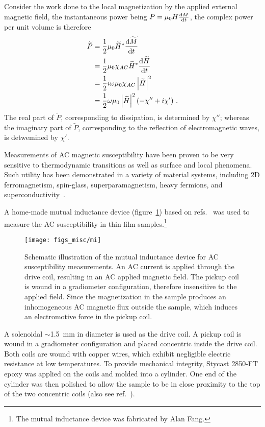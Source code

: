 Consider the work done to the local magnetization by the applied external magnetic field, the instantaneous power being $P = \mu_0H\frac{\mathop{}\!\mathrm{d} M}{\mathop{}\!\mathrm{d} t}$, the complex power per unit volume is therefore%
\begin{align}%
    \widetilde{P} &= \frac{1}{2}\mu_0 \widetilde{H}^* \frac{\diff \widetilde{M}}{\diff t}\nonumber\\
        &= \frac{1}{2}\mu_0\chi_{AC}\widetilde{H}^*\frac{\diff \widetilde{H}}{\diff t}\nonumber\\
        &= \frac{1}{2}i\omega\mu_0\chi_{AC}\left|\widetilde{H}\right|^2\nonumber\\
        &= \frac{1}{2}\omega\mu_0\left|\widetilde{H}\right|^2(-\chi''+i\chi')\label{eq:acm_power}~.
\end{align}%
The real part of $\widetilde{P}$, corresponding to dissipation, is determined by $\chi''$; whereas the imaginary part of $\widetilde{P}$, corresponding to the reflection of electromagnetic waves, is detwemined by $\chi'$.

Measurements of AC magnetic susceptibility have been proven to be very sensitive to thermodynamic transitions as well as surface and local phenomena. Such utility has been demonstrated in a variety of material systems, including 2D ferromagnetism, spin-glass, superparamagnetism, heavy fermions, and superconductivity~\cite{ac_nitroxide, ac_spin_glass, ac_superpara, Ando1994, Gegenwart2005, Schemm2014}.

A home-made mutual inductance device (figure~\ref{fig:mi_sketch}) based on refs.~\cite{Jeanneret1989} was used to measure the AC susceptibility in thin film samples.\footnote{The mutual inductance device was fabricated by Alan Fang.} %
\begin{figure}[ht]%
	\centering%
    \texttt{[image: figs\_misc/mi]}%
    \caption[Schematic illustration of the mutual inductance device for AC susceptibility measurements]{\label{fig:mi_sketch}Schematic illustration of the mutual inductance device for AC susceptibility measurements. An AC current is applied through the drive coil, resulting in an AC applied magnetic field. The pickup coil is wound in a gradiometer configuration, therefore insensitive to the applied field. Since the magnetization in the sample produces an inhomogeneous AC magnetic flux outside the sample, which induces an electromotive force in the pickup coil.}%
\end{figure}%
%
A solenoidal $\sim$\SI{1.5}{mm} in diameter is used as the drive coil. A pickup coil is wound in a gradiometer configuration and placed concentric inside the drive coil. Both coils are wound with copper wires, which exhibit negligible electric resistance at low temperatures. To provide mechanical integrity, Stycast 2850-FT epoxy was applied on the coils and molded into a cylinder. One end of the cylinder was then polished to allow the sample to be in close proximity to the top of the two concentric coils (also see ref.~\cite{YazdaniThesis}).

